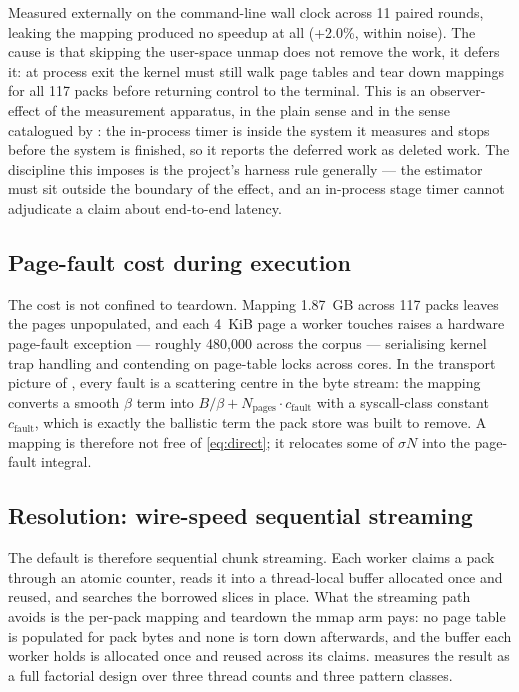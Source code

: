 \documentclass[11pt,letterpaper]{article}
\begin{document}
Measured externally on the command-line wall clock across 11 paired rounds,
leaking the mapping produced no speedup at all (+2.0\%, within noise). The
cause is that skipping the user-space unmap does not remove the work, it
defers it: at process exit the kernel must still walk page tables and tear
down mappings for all 117 packs before returning control to the terminal.
This is an observer-effect of the measurement apparatus, in the plain
sense and in the sense catalogued by \cite{mytkowicz2009}: the in-process timer is inside the system it measures and stops
before the system is finished, so it reports the deferred work as deleted
work. The discipline this imposes is the project's harness rule
generally --- the estimator must sit outside the boundary of the effect,
and an in-process stage timer cannot adjudicate a claim about end-to-end
latency.

\subsection{Page-fault cost during execution}
The cost is not confined to teardown. Mapping 1.87~GB across 117 packs leaves
the pages unpopulated, and each 4~KiB page a worker touches raises a hardware
page-fault exception --- roughly 480{,}000 across the corpus --- serialising
kernel trap handling and contending on page-table locks across cores. In the
transport picture of , every fault is a scattering centre in
the byte stream: the mapping converts a smooth $\beta$ term into
$B/\beta + N_{\text{pages}}\cdot c_{\text{fault}}$ with a syscall-class
constant $c_{\text{fault}}$, which is exactly the ballistic term the pack
store was built to remove. A mapping is therefore not free of
\eqref{eq:direct}; it relocates some of $\sigma N$ into the page-fault
integral.

\subsection{Resolution: wire-speed sequential streaming}
The default is therefore sequential chunk streaming.
Each worker claims a pack through an atomic counter, reads it into a
thread-local buffer allocated once and reused, and searches the borrowed
slices in place. What the streaming path avoids is the per-pack mapping and
teardown the mmap arm pays: no page table is populated for pack bytes and none
is torn down afterwards, and the buffer each worker holds is allocated once and
reused across its claims.  measures the result as a full factorial design
over three thread counts and three pattern classes.
\end{document}
